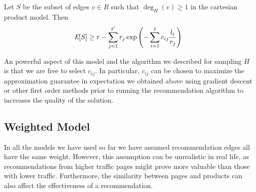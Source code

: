 \begin{thm}
Let $S$ be the subset of edges $v\in R$ such that $\deg_H(v) \geq 1$ in the cartesian product model. Then
\[ \emph{\text{E}}[S] \geq r - \sum_{j=1}^{t'} r_j \exp\left(-\sum_{i=1}^t c_{ij} \frac{l_i}{r_j}\right)\]
\end{thm}
%

An powerful aspect of this model and the algorithm
we described for sampling $H$ is that we are free to select $c_{ij}$.
In particular, $c_{ij}$ can be chosen to maximize the
approximation guarantee in expectation we obtained above using
gradient descent or other first order methods prior to running the
recommendation algorithm to increases the quality of the solution.

\subsection{Weighted Model}
\label{weighted}
In all the models we have used so far we have assumed recommendation edges
all have the same weight. However, this assumption can be unrealistic in real life,
as recommendations from higher traffic pages might prove more valuable than those
with lower traffic. Furthermore, the similarity between pages and products can
also affect the effectiveness of a recommendation.

